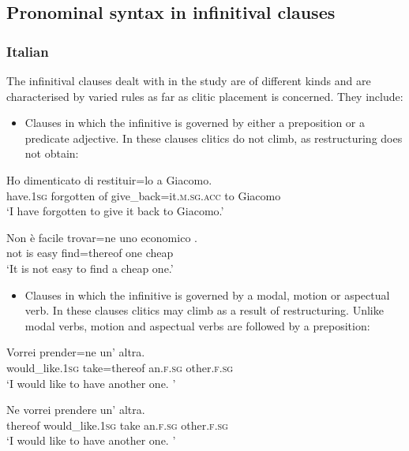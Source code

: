 \documentclass[output=paper,modfonts,nonflat,newtxmath]{langsci/langscibook}
\begin{document}
\subsection{{Pronominal} {syntax} {in} {infinitival} {clauses}} %
\label{sec:sciutti:2.2}

\subsubsection{Italian} %

The infinitival clauses dealt with in the study are of different kinds and are characterised by varied rules as far as clitic placement is concerned. They include:

\begin{itemize}
\item
Clauses in which the infinitive is governed by either a preposition or a predicate adjective. In these clauses clitics do not climb, as restructuring does not obtain:

\end{itemize}

\ea \label{ex:sciutti:3}
    \gll Ho dimenticato di restituir=lo a Giacomo.\\
        have.\textsc{1sg} forgotten of give\_back=it.\textsc{m.sg.acc} to Giacomo\\
    \glt  ‘I have forgotten to give it back to Giacomo.’
\z

\ea \label{ex:sciutti:4}
    \gll Non è facile trovar=ne uno economico .\\
         not is easy find=thereof one cheap\\
    \glt  ‘It is not easy to find a cheap one.’
\z


\begin{itemize}
\item
Clauses in which the infinitive is governed by a modal, motion or aspectual verb. In these clauses clitics may climb as a result of restructuring. Unlike modal verbs, motion and aspectual verbs are followed by a preposition:

\end{itemize}

\ea \label{ex:sciutti:5}
    \begin{xlist}
    \ex \label{ex:sciutti:5a}
    \gll Vorrei prender=ne un’ altra.\\
         would\_like.\textsc{1sg} take=thereof an.\textsc{f.sg} other.\textsc{f.sg}\\
    \glt  ‘I would like to have another one. ’

    \ex \label{ex:sciutti:5b}
    \gll Ne vorrei prendere un’ altra.\\
         thereof would\_like.\textsc{1sg} take an.\textsc{f.sg} other.\textsc{f.sg}\\
    \glt  ‘I would like to have another one. ’
    \end{xlist}
\z
\end{document}
